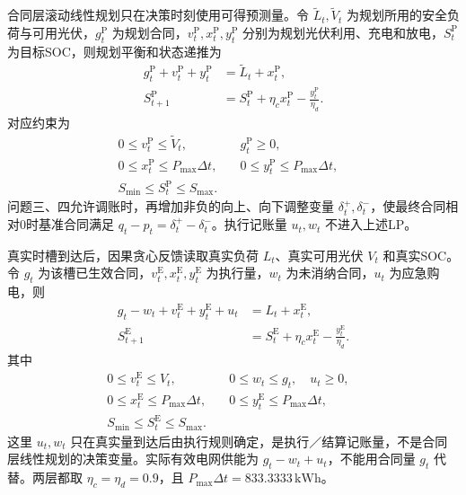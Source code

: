 合同层滚动线性规划只在决策时刻使用可得预测量。令 $\widetilde L_t,\widetilde V_t$ 为规划所用的安全负荷与可用光伏，$g_t^{\mathrm P}$ 为规划合同，$v_t^{\mathrm P},x_t^{\mathrm P},y_t^{\mathrm P}$ 分别为规划光伏利用、充电和放电，$S_t^{\mathrm P}$ 为目标SOC，则规划平衡和状态递推为
\begin{align}
 g_t^{\mathrm P}+v_t^{\mathrm P}+y_t^{\mathrm P}
 &=\widetilde L_t+x_t^{\mathrm P},
 \label{eq:plan-balance}\\
 S_{t+1}^{\mathrm P}
 &=S_t^{\mathrm P}+\eta_c x_t^{\mathrm P}-\frac{y_t^{\mathrm P}}{\eta_d}.
 \label{eq:plan-soc}
\end{align}
对应约束为
\begin{align}
 0\le v_t^{\mathrm P}\le\widetilde V_t,\quad
 &g_t^{\mathrm P}\ge0, \label{eq:plan-renew}\\
 0\le x_t^{\mathrm P}\le P_{\max}\Delta t,\quad
 &0\le y_t^{\mathrm P}\le P_{\max}\Delta t,\label{eq:plan-power}\\
 S_{\min}\le S_t^{\mathrm P}\le S_{\max}.&&\label{eq:plan-bounds}
\end{align}
问题三、四允许调账时，再增加非负的向上、向下调整变量 $\delta_t^+,\delta_t^-$，使最终合同相对0时基准合同满足 $q_t-p_t=\delta_t^+-\delta_t^-$。执行记账量 $u_t,w_t$ 不进入上述LP。

真实时槽到达后，因果贪心反馈读取真实负荷 $L_t$、真实可用光伏 $V_t$ 和真实SOC。令 $g_t$ 为该槽已生效合同，$v_t^{\mathrm E},x_t^{\mathrm E},y_t^{\mathrm E}$ 为执行量，$w_t$ 为未消纳合同，$u_t$ 为应急购电，则
\begin{align}
 g_t-w_t+v_t^{\mathrm E}+y_t^{\mathrm E}+u_t
 &=L_t+x_t^{\mathrm E},
 \label{eq:exec-balance}\\
 S_{t+1}^{\mathrm E}
 &=S_t^{\mathrm E}+\eta_c x_t^{\mathrm E}-\frac{y_t^{\mathrm E}}{\eta_d}.
 \label{eq:exec-soc}
\end{align}
其中
\begin{align}
 0\le v_t^{\mathrm E}\le V_t,\quad
 &0\le w_t\le g_t,\quad u_t\ge0,\label{eq:exec-renew}\\
 0\le x_t^{\mathrm E}\le P_{\max}\Delta t,\quad
 &0\le y_t^{\mathrm E}\le P_{\max}\Delta t,\label{eq:exec-power}\\
 S_{\min}\le S_t^{\mathrm E}\le S_{\max}.&&\label{eq:exec-bounds}
\end{align}
这里 $u_t,w_t$ 只在真实量到达后由执行规则确定，是执行／结算记账量，不是合同层线性规划的决策变量。实际有效电网供能为 $g_t-w_t+u_t$，不能用合同量 $g_t$ 代替。两层都取 $\eta_c=\eta_d=0.9$，且 $P_{\max}\Delta t=833.3333\,\mathrm{kWh}$。

